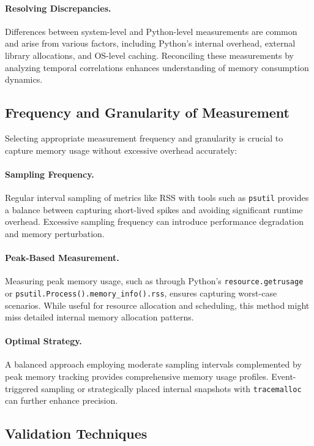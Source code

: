 \paragraph{Resolving Discrepancies.}
Differences between system-level and Python-level measurements are common and arise from various factors, including Python's internal overhead, external library allocations, and \ac{OS}-level caching.
Reconciling these measurements by analyzing temporal correlations enhances understanding of memory consumption dynamics.

\subsection{Frequency and Granularity of Measurement}
\label{subsec:mmc-bestpractices-frequency-granularity}

Selecting appropriate measurement frequency and granularity is crucial to capture memory usage without excessive overhead accurately:

\paragraph{Sampling Frequency.}
Regular interval sampling of metrics like \ac{RSS} with tools such as \texttt{psutil} provides a balance between capturing short-lived spikes and avoiding significant runtime overhead.
Excessive sampling frequency can introduce performance degradation and memory perturbation.

\paragraph{Peak-Based Measurement.}
Measuring peak memory usage, such as through Python's \texttt{resource.getrusage} or \texttt{psutil.Process().memory\_info().rss}, ensures capturing worst-case scenarios.
While useful for resource allocation and scheduling, this method might miss detailed internal memory allocation patterns.

\paragraph{Optimal Strategy.}
A balanced approach employing moderate sampling intervals complemented by peak memory tracking provides comprehensive memory usage profiles.
Event-triggered sampling or strategically placed internal snapshots with \texttt{tracemalloc} can further enhance precision.

\subsection{Validation Techniques}
\label{subsec:mmc-bestpractices-validation}

